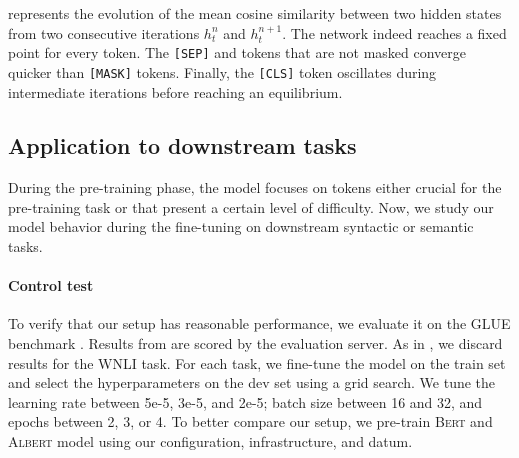 


 represents the evolution of the mean cosine similarity between two hidden states from two consecutive iterations $h^n_t$ and $h^{n+1}_t$. The network indeed reaches a fixed point for every token. The \texttt{[SEP]} and tokens that are not masked converge quicker than \texttt{[MASK]} tokens. Finally, the \texttt{[CLS]} token oscillates during intermediate iterations before reaching an equilibrium.

\subsection{Application to downstream tasks}

During the pre-training phase, the model focuses on tokens either crucial for the pre-training task or that present a certain level of difficulty. Now, we study our model behavior during the fine-tuning on downstream syntactic or semantic tasks.


\paragraph{Control test} To verify that our setup has reasonable performance, we evaluate it on the GLUE benchmark \parencite{wang_19}.
Results from  are scored by the evaluation server. As in \textcite{devlin_19}, we discard results for the WNLI task. For each task, we fine-tune the model on the train set and select the hyperparameters on the dev set using a grid search. We tune the learning rate between 5e-5, 3e-5, and 2e-5; batch size between 16 and 32, and epochs between 2, 3, or 4. To better compare our setup, we pre-train \textsc{Bert} and \textsc{Albert} model using our configuration, infrastructure, and datum.

